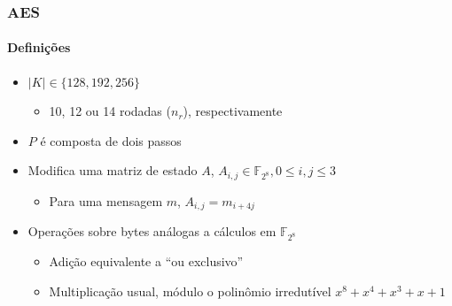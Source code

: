 \documentclass[12pt]{beamer}
\newcommand{\length}[1]{\vert{} #1 \vert{}}
\begin{document}
\begin{frame}
  \frametitle{AES}
  \framesubtitle{Definições}
  \begin{itemize}
    \item $\length{K} \in \{128, 192, 256\}$
    \begin{itemize}
      \item 10, 12 ou 14 rodadas ($n_r$), respectivamente
    \end{itemize}
    \item $P$ é composta de dois passos
    \item Modifica uma matriz de estado $A$, $A_{i,j} \in \mathbb{F}_{2^8}, 0
        \leq i, j \leq 3$
    \begin{itemize}
      \item Para uma mensagem $m$, $A_{i,j} = m_{i + 4j}$
    \end{itemize}
    \item Operações sobre bytes análogas a cálculos em $\mathbb{F}_{2^8}$
    \begin{itemize}
      \item Adição equivalente a ``ou exclusivo''
      \item Multiplicação usual, módulo o polinômio irredutível $x^8 + x^4 +
          x^3 + x + 1$
    \end{itemize}
  \end{itemize}
\end{frame}
\end{document}
